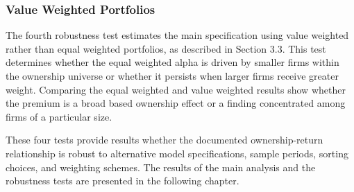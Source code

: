 \subsubsection{Value Weighted Portfolios}

The fourth robustness test estimates the main specification using value weighted rather than equal weighted portfolios, as described in Section 3.3. This test determines whether the equal weighted alpha is driven by smaller firms within the ownership universe or whether it persists when larger firms receive greater weight. Comparing the equal weighted and value weighted results show whether the premium is a broad based ownership effect or a finding concentrated among firms of a particular size.

These four tests provide results whether the documented ownership-return relationship is robust to alternative model specifications, sample periods, sorting choices, and weighting schemes. The results of the main analysis and the robustness tests are presented in the following chapter.
